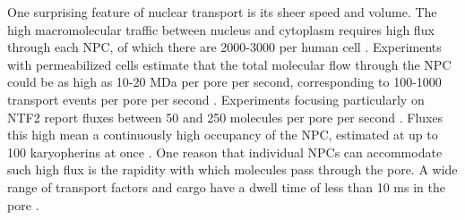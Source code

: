 One surprising feature of nuclear transport is its sheer speed and volume.  The high macromolecular traffic between nucleus and cytoplasm requires high flux through each NPC, of which there are 2000-3000 per human cell \cite{knockenhauer16}.  Experiments with permeabilized cells estimate that the total molecular flow through the NPC could be as high as 10-20 MDa per pore per second, corresponding to  100-1000 transport events per pore per second \cite{ribbeck01}.  Experiments focusing particularly on NTF2 report fluxes between 50 and 250 molecules per pore per second \cite{ribbeck01, siebrasse02, kiskin03}.  Fluxes this high mean a continuously high occupancy of the NPC, estimated at up to 100 karyopherins at once \cite{paradise07}. One reason that individual NPCs can accommodate such high flux is the rapidity with which molecules pass through the pore.  A wide range of transport factors and cargo have a dwell time of less than 10 ms in the pore \cite{tu11, yang06, dange08, kubitscheck05}.  %



